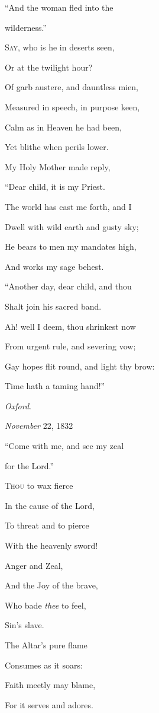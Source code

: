 
``And the woman fled into the

wilderness.''

S\textsc{ay}, who is he in deserts seen,

Or at the twilight hour?

Of garb austere, and dauntless mien,

Measured in speech, in purpose keen,

Calm as in Heaven he had been,

Yet blithe when perils lower.

My Holy Mother made reply,

``Dear child, it is my Priest.

The world has cast me forth, and I

Dwell with wild earth and gusty sky;

He bears to men my mandates high,

And works my sage behest.

``Another day, dear child, and thou

Shalt join his sacred band.

Ah! well I deem, thou shrinkest now

From urgent rule, and severing vow;

Gay hopes flit round, and light thy brow:

Time hath a taming hand!''

\emph{Oxford}.

\emph{November} 22, 1832


``Come with me, and see my zeal

for the Lord.''

T\textsc{hou} to wax fierce

In the cause of the Lord,

To threat and to pierce

With the heavenly sword!

Anger and Zeal,

And the Joy of the brave,

Who bade \emph{thee} to feel,

Sin's slave.

The Altar's pure flame

Consumes as it soars:

Faith meetly may blame,

For it serves and adores.

